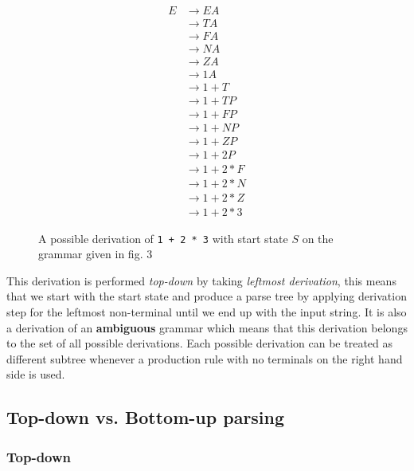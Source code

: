 \documentclass[12pt, letterpaper]{article}
\theoremstyle{definition}
\begin{document}
\begin{figure}[h]
    \begin{equation}
        \begin{split}
            E &\rightarrow EA\\
            &\rightarrow TA\\
            &\rightarrow FA\\
            &\rightarrow NA\\
            &\rightarrow ZA\\
            &\rightarrow 1 A\\
            &\rightarrow 1 + T\\
            &\rightarrow 1 + TP\\
            &\rightarrow 1 + FP\\
            &\rightarrow 1 + NP\\
            &\rightarrow 1 + ZP\\
            &\rightarrow 1 + 2 P\\
            &\rightarrow 1 + 2 * F\\
            &\rightarrow 1 + 2 * N\\
            &\rightarrow 1 + 2 * Z\\
            &\rightarrow 1 + 2 * 3
        \end{split}
        \nonumber
    \end{equation}
    \vspace{-1.5em}
    \cprotect\caption{A possible derivation of \verb|1 + 2 * 3| with start state $S$ on the grammar given in fig. 3}
\end{figure}

This derivation is performed \textit{top-down} by taking \textit{leftmost derivation}, this means that we start with the start state and produce a parse tree by applying derivation step for the leftmost non-terminal until we end up with the input string. It is also a derivation of an \textbf{ambiguous} grammar which means that this derivation belongs to the set of all possible derivations. Each possible derivation can be treated as different subtree whenever a production rule with no terminals on the right hand side is used.

\subsection{Top-down vs. Bottom-up parsing}

\subsubsection{Top-down}
\end{document}
